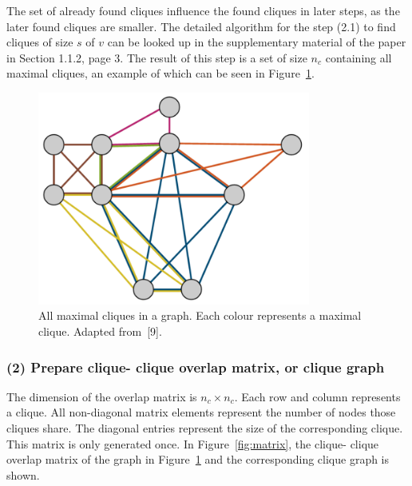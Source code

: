 \documentclass[runningheads,a4paper]{llncs}
\begin{document}
\medskip

The set of already found cliques influence the found cliques in later steps, as the later found cliques are smaller.
The detailed algorithm for the step (2.1) to find cliques of size $s$ of $v$ can be looked up in the supplementary material of the paper in Section 1.1.2, page 3.
The result of this step is a set of size $n_c$ containing all maximal cliques, an example of which can be seen in Figure~\ref{fig:allmaxcliques}.

\begin{figure}
\begin{center}
	\includegraphics[width=0.8\textwidth]{img/allmaxcliques.png}
		\caption{All maximal cliques in a graph. Each colour represents a maximal clique. Adapted from~[9].}
		\label{fig:allmaxcliques}
\end{center}
\end{figure}

\subsubsection{(2) Prepare clique- clique overlap matrix, or clique graph}
The dimension of the overlap matrix is $n_c \times n_c$.
Each row and column represents a clique.
All non-diagonal matrix elements represent the number of nodes those cliques share.
The diagonal entries represent the size of the corresponding clique.
This matrix is only generated once.
In Figure~\ref{fig:matrix}, the clique- clique overlap matrix of the graph in Figure~\ref{fig:allmaxcliques} and the corresponding clique graph is shown.
\end{document}

